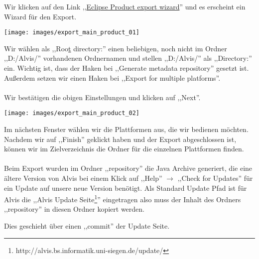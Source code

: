 \documentclass[10pt,a4paper]{article}
\begin{document}
Wir klicken auf den  Link ,,\underline{Eclipse Product export wizard}'' und es erscheint ein Wizard für den Export.

\begin{center}
\texttt{[image: images/export\_main\_product\_01]}
\end{center}

Wir wählen als ,,Roo\underline{t} directory:'' einen beliebigen, noch nicht im Ordner ,,D:/Alvis/'' vorhandenen Ordnernamen und stellen ,,D:/Alvis/'' als ,,Directory:'' ein. 
Wichtig ist, dass der Haken bei ,,Generate metadata repository'' gesetzt ist.
Außerdem setzen wir einen Haken bei ,,Export for multiple platforms''.\\ \\
Wir bestätigen die obigen Einstellungen und klicken auf ,,Next''.
\begin{center}
\texttt{[image: images/export\_main\_product\_02]}
\end{center}
Im nächsten Fenster wählen wir die Plattformen aus, die wir bedienen möchten.
Nachdem wir auf ,,Finish'' geklickt haben und der Export abgeschlossen ist, können wir im Zielverzeichnis die Ordner für die einzelnen Plattformen finden.
\\ \\
Beim Export wurden im Ordner ,,repository'' die Java Archive generiert, die eine ältere Version von Alvis bei einem Klick auf ,,Help'' \(\rightarrow \) ,,Check for Updates'' für ein Update auf unsere neue Version benötigt. Als Standard Update Pfad ist für Alvis die ,,Alvis Update Seite\footnote{http://alvis.bs.informatik.uni-siegen.de/update/}'' eingetragen also muss der Inhalt des Ordners ,,repository'' in diesen Ordner kopiert werden.

Dies geschieht über einen ,,commit'' der Update Seite.
\end{document}
